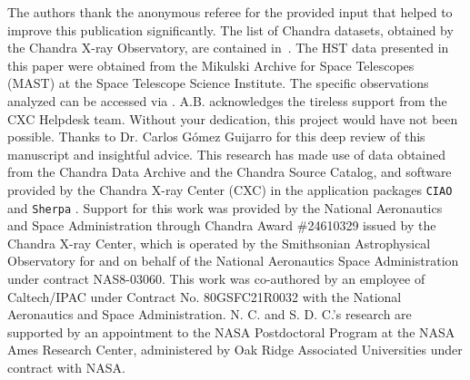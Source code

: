 \documentclass[modern]{CORE-AAS/aastex631}
\begin{document}
\begin{acknowledgments}
The authors thank the anonymous referee for the provided input that helped to improve this publication significantly. The list of Chandra datasets, obtained by the Chandra X-ray Observatory, are contained in~. The HST data presented in this paper were obtained from the Mikulski Archive for Space Telescopes (MAST) at the Space Telescope Science Institute. The specific observations analyzed can be accessed via . A.B. acknowledges the tireless support from 
% 
the CXC Helpdesk team. Without your dedication, this project would have not been possible. Thanks to Dr. Carlos G\'{o}mez Guijarro for this deep review of this manuscript and insightful advice. This research has made use of data obtained from the Chandra Data Archive and the Chandra Source Catalog, and software provided by the Chandra X-ray Center (CXC) in the application packages \texttt{CIAO} \citep{fruscione+2006inproceedings_62701V} and \texttt{Sherpa} \citep{freeman+2001inproceedings_76}. 
Support for this work was provided by the National Aeronautics and Space Administration through Chandra Award \#24610329 issued by the Chandra X-ray Center, which is operated by the Smithsonian Astrophysical Observatory for and on behalf of the National Aeronautics Space Administration under contract NAS8-03060.
This work was co-authored by an employee of Caltech/IPAC under Contract No. 80GSFC21R0032 with the National Aeronautics and Space Administration. N. C. and S. D. C.'s research are supported by an appointment to the NASA Postdoctoral Program at the NASA Ames Research Center, administered by Oak Ridge Associated Universities under contract with NASA. 
\end{acknowledgments}
\end{document}
